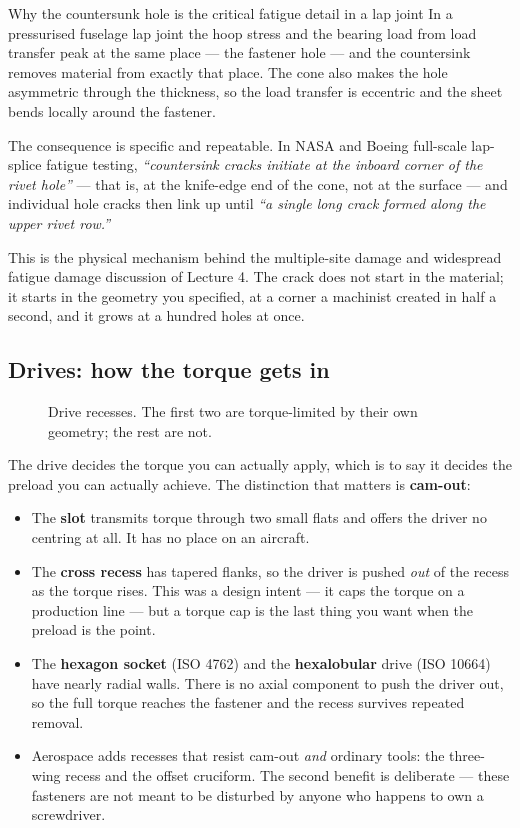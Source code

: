 \documentclass[11pt,a4paper]{article}
\begin{document}
\begin{aerobox}{Why the countersunk hole is the critical fatigue detail in a lap joint}
In a pressurised fuselage lap joint the hoop stress and the bearing load from load transfer peak
at the same place --- the fastener hole --- and the countersink removes material from exactly that
place. The cone also makes the hole asymmetric through the thickness, so the load transfer is
eccentric and the sheet bends locally around the fastener.

\medskip
The consequence is specific and repeatable. In NASA and Boeing full-scale lap-splice fatigue
testing, \emph{``countersink cracks initiate at the inboard corner of the rivet hole''} --- that is,
at the knife-edge end of the cone, not at the surface --- and individual hole cracks then link up
until \emph{``a single long crack formed along the upper rivet row.''}

\medskip
This is the physical mechanism behind the multiple-site damage and widespread fatigue damage
discussion of Lecture 4. The crack does not start in the material; it starts in the geometry you
specified, at a corner a machinist created in half a second, and it grows at a hundred holes at
once.
\end{aerobox}

\subsection{Drives: how the torque gets in}

\begin{figure}[H]\centering
\resizebox{\textwidth}{!}{}
\caption{Drive recesses. The first two are torque-limited by their own geometry; the rest are not.}
\label{fig:drives}
\end{figure}

The drive decides the torque you can actually apply, which is to say it decides the preload you
can actually achieve. The distinction that matters is \textbf{cam-out}:

\begin{itemize}[leftmargin=*,itemsep=2pt]
\item The \textbf{slot} transmits torque through two small flats and offers the driver no
  centring at all. It has no place on an aircraft.
\item The \textbf{cross recess} has tapered flanks, so the driver is pushed \emph{out} of the
  recess as the torque rises. This was a design intent --- it caps the torque on a production
  line --- but a torque cap is the last thing you want when the preload is the point.
\item The \textbf{hexagon socket} (ISO 4762) and the \textbf{hexalobular} drive (ISO 10664) have
  nearly radial walls. There is no axial component to push the driver out, so the full torque
  reaches the fastener and the recess survives repeated removal.
\item Aerospace adds recesses that resist cam-out \emph{and} ordinary tools: the three-wing
  recess and the offset cruciform. The second benefit is deliberate --- these fasteners are not
  meant to be disturbed by anyone who happens to own a screwdriver.
\end{itemize}
\end{document}
